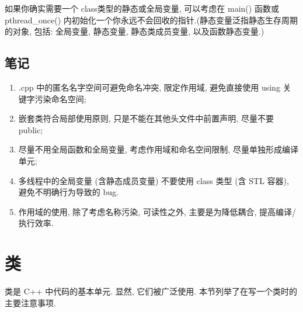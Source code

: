 \documentclass[a4paper,11pt,CJK]{article}
\begin{document}
\begin{CJK}{UTF8}{gbsn}
\indent 如果你确实需要一个 class类型的静态或全局变量, 可以考虑在 main() 函数或 pthread\_once() 内初始化一个你永远不会回收的指针.(静态变量泛指静态生存周期的对象, 包括: 全局变量, 静态变量, 静态类成员变量, 以及函数静态变量.)

\subsection{笔记}
\begin{enumerate}
    \item .cpp 中的匿名名字空间可避免命名冲突, 限定作用域, 避免直接使用 using 关键字污染命名空间;

    \item 嵌套类符合局部使用原则, 只是不能在其他头文件中前置声明, 尽量不要 public;

    \item 尽量不用全局函数和全局变量, 考虑作用域和命名空间限制, 尽量单独形成编译单元;

    \item 多线程中的全局变量 (含静态成员变量) 不要使用 class 类型 (含 STL 容器), 避免不明确行为导致的 bug.

    \item 作用域的使用, 除了考虑名称污染, 可读性之外, 主要是为降低耦合, 提高编译/执行效率.

\end{enumerate}
\newpage

\section{类}
类是 C++ 中代码的基本单元. 显然, 它们被广泛使用. 本节列举了在写一个类时的主要注意事项.\\

\end{CJK}
\end{document}
